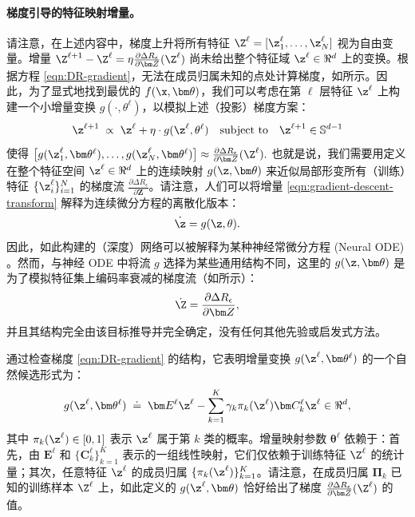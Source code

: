 \documentclass[../../book-main_zh.tex]{subfiles}
\begin{document}
\paragraph{梯度引导的特征映射增量。} 请注意，在上述内容中，梯度上升将所有特征 $\Z^{\ell} =
[\z^{\ell}_{1}, \dots, \z^{\ell}_{N}]$ 视为自由变量。增量 $\Z^{\ell+1} - \Z^{\ell} = \eta \frac{\partial \Delta
R_{\epsilon}}{\partial \bm Z}(\Z^\ell)$ 尚未给出整个特征域 $\z^\ell \in \Re^d$ 上的变换。根据方程 \eqref{eqn:DR-gradient}，无法在成员归属未知的点处计算梯度，如所示。因此，为了显式地找到最优的 $f(\x,\bm  \theta)$，我们可以考虑在第 $\ell$ 层特征 $\z^\ell$ 上构建一个小增量变换 $g(\cdot, \theta^{\ell})$，以模拟上述（投影）梯度方案：
\begin{equation}
    \z^{\ell + 1}   \; \propto \; \z^{\ell} + \eta\cdot  g(\z^{\ell},
    \theta^{\ell}) \quad \mbox{subject to} \quad \z^{\ell +1}
    \in \mathbb{S}^{d-1}
    \label{eqn:gradient-descent-transform}
\end{equation}
使得 $\big[g(\z_1^{\ell}, \bm \theta^{\ell}), \ldots,
g(\z_N^{\ell}, \bm \theta^{\ell}) \big] \approx \frac{\partial \Delta
R_{\epsilon}}{\partial \bm Z}(\Z^\ell).$ 也就是说，我们需要用定义在整个特征空间 $\z^\ell \in \Re^d$ 上的连续映射 $g(\z,\bm
\theta)$ 来近似局部形变所有（训练）特征 $\{\z_i^\ell\}_{i=1}^N$ 的梯度流 $\frac{\partial \Delta
R_{\epsilon}}{\partial \bm Z}$。请注意，人们可以将增量 \eqref{eqn:gradient-descent-transform} 解释为连续微分方程的离散化版本：
\begin{equation}
    \dot{\z} = g(\z, \theta).
\end{equation}
因此，如此构建的（深度）网络可以被解释为某种神经常微分方程 (Neural ODE) \cite{chen2018neural}。然而，与神经 ODE 中将流 $g$ 选择为某些通用结构不同，这里的 $g(\z, \bm\theta)$ 是为了模拟特征集上编码率衰减的梯度流（如所示）：
\begin{equation*}
    \dot{\Z} = \frac{\partial \Delta R_{\epsilon}}{\partial \bm Z},
\end{equation*}
并且其结构完全由该目标推导并完全确定，没有任何其他先验或启发式方法。

通过检查梯度 \eqref{eqn:DR-gradient} 的结构，它表明增量变换 $g(\z^\ell, \bm \theta^\ell)$ 的一个自然候选形式为：
\begin{equation}
    g(\z^\ell, \bm \theta^\ell) \; \doteq \; \bm E^\ell \z^\ell -
    \sum_{k=1}^K \gamma_{k} \pi_k(\z^\ell)\bm C_{k}^{\ell}  \z^{\ell}
    \in \Re^d,
    \label{eqn:DR-gradient-transform}
\end{equation}
其中 $\pi_k(\z^\ell) \in [0,1]$ 表示 $\z^{\ell}$ 属于第 $k$ 类的概率。增量映射参数 $\bm \theta^\ell$ 依赖于：首先，由 $\bm E^{\ell}$ 和 $\{ \bm C^{\ell}_{k}\}_{k=1}^{K}$ 表示的一组线性映射，它们仅依赖于训练特征 $\Z^\ell$ 的统计量；其次，任意特征 $\z^\ell$ 的成员归属 $\{ \pi_k(\z^\ell)\}_{k=1}^K$。请注意，在成员归属 $\bm \Pi_k$ 已知的训练样本 $\Z^\ell$ 上，如此定义的 $g(\z^\ell, \bm
\theta)$ 恰好给出了梯度 $\frac{\partial \Delta
R_{\epsilon}}{\partial \bm Z}(\Z^\ell)$ 的值。
\end{document}
